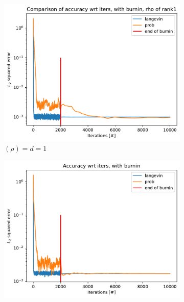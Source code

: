 \documentclass[12pt]{memoir}
\newcommand{\rhorankn}[1]{\text{rank}$(\rho)=#1$}
\begin{document}
\begin{figure}[H]
    \centering
    \begin{subfigure}[b]{0.49\textwidth}
        \centering
        \includegraphics[width=\textwidth]{figures/experiments/baseline/diff_rank/iters_acc_comp_iters_no_avg_rank1-1.png}
        \caption{\rhorankn{d=1}}
        \label{fig:conv-plot-diff-rank-1-sub}
    \end{subfigure}
    \hfill
    \begin{subfigure}[b]{0.49\textwidth}
        \centering
        \includegraphics[width=\textwidth]{figures/experiments/baseline/diff_rank/iters_acc_comp_iters_no_avg-1.png}

\end{subfigure}
\end{figure}
\end{document}
